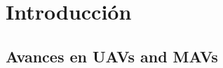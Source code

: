 \documentclass[a4paper,12pt]{book}
\begin{document}



\mainmatter
\pagestyle{fancy}
\clearpage

\chapter{Introducción}\label{chapter:Introduccion}

\section{Avances en UAVs and MAVs}
\end{document}
